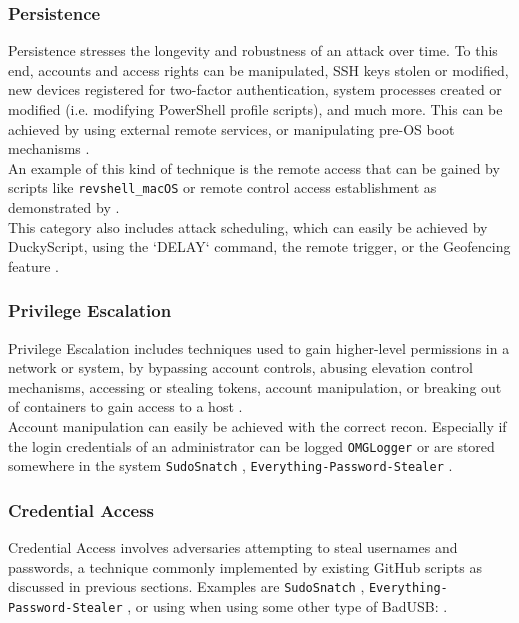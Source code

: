 \subsubsection{Persistence} \label{persistence}

Persistence stresses the longevity and robustness of an attack over time. To this end, accounts and access rights can be manipulated, SSH keys stolen or modified,
new devices registered for two-factor authentication, system processes created or modified  (i.e. modifying PowerShell profile scripts), and much more. This can be achieved by using external remote services, or manipulating pre-OS boot mechanisms \cite{MITREATTCK}. \\
An example of this kind of technique is the remote access that can be gained by scripts like \verb|revshell_macOS| \cite{OmgpayloadsPayloadsLibrary}
or remote control access establishment as demonstrated by \cite{bojovicRisingThreatHardware2019}. \\
This category also includes attack scheduling, which can easily be achieved by DuckyScript, using the `DELAY` command, the remote trigger, or the Geofencing feature \cite{hak5MGCable}.

\subsubsection{Privilege Escalation}

Privilege Escalation includes techniques used to gain higher-level permissions in a network or system, by bypassing account controls, abusing elevation control mechanisms, accessing or stealing tokens, account manipulation, or breaking out of containers to gain access to a host \cite{MITREATTCK}. \\
Account manipulation can easily be achieved with the correct recon. Especially if the login credentials of an administrator can be logged \verb|OMGLogger| \cite{OmgpayloadsPayloadsLibrary} or are stored somewhere in the system \verb|SudoSnatch| \cite{OmgpayloadsPayloadsLibrary}, \verb|Everything-Password-Stealer| \cite{OmgpayloadsPayloadsLibrary}.

\subsubsection{Credential Access}

Credential Access involves adversaries attempting to steal usernames and passwords, a technique commonly implemented by existing GitHub scripts as discussed in previous sections.
Examples are \verb|SudoSnatch| \cite{OmgpayloadsPayloadsLibrary}, \verb|Everything-Password-Stealer| \cite{OmgpayloadsPayloadsLibrary}, or using when using some other type of BadUSB:  \cite{muslimImplementationAnalysisUSB2020}.



